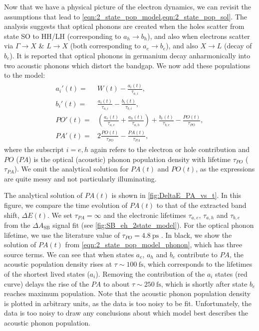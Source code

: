 Now that we have a physical picture of the electron dynamics, we can revisit the assumptions that lead to \cref{eqn:2_state_pop_model,eqn:2_state_pop_sol}. The analysis suggests that optical phonons are created when the holes scatter from state SO to HH/LH (corresponding to $a_h \rightarrow b_h$), and also when electrons scatter via $\Gamma \rightarrow X$ \& $L \rightarrow X$ (both corresponding to $a_e \rightarrow b_e$), and also $X \rightarrow L$ (decay of $b_e$). It is reported that optical phonons in germanium decay anharmonically into two acoustic phonons which distort the bandgap. We now add these populations to the model:
\begin{align}
\label{eqn:2_state_pop_model_phonon}
\begin{split}
a_{i}'(t) ={}& W(t) - \frac{a_{i}(t)}{\tau_{a,i}}, \\
b_{i}'(t) ={}& \frac{a_{i}(t)}{\tau_{a,i}} - \frac{b_{i}(t)}{\tau_{b,i}}, \\
PO'(t) ={}& \left( \frac{a_e(t)}{\tau_{a,e}} + \frac{a_h(t)}{\tau_{a,h}} \right) + \frac{b_e(t)}{\tau_{b,e}} - \frac{PO(t)}{\tau_{PO}}, \\
PA'(t) ={}& 2 \frac{PO(t)}{\tau_{PO}} - \frac{PA(t)}{\tau_{PA}},
\end{split}
\end{align}
where the subscript $i=e,h$ again refers to the electron or hole contribution and $PO$ ($PA$) is the optical (acoustic) phonon population density with lifetime $\tau_{PO}$ ($\tau_{PA}$). We omit the analytical solution for $PA(t)$ and $PO(t)$, as the expressions are quite messy and not particularly illuminating.

The analytical solution of $PA(t)$ is shown in \cref{fig:DeltaE_PA_vs_t}. In this figure, we compare the time evolution of $PA(t)$ to that of the extracted band shift, $\Delta E(t)$. We set $\tau_{PA} = \infty$ and the electronic lifetimes $\tau_{a,e}$, $\tau_{a,h}$ and $\tau_{b,e}$ from the $\Delta A_{\textrm{SB}}$ signal fit (see \cref{fig:SB_eh_2state_model}). For the optical phonon lifetime, we use the literature value of $\tau_{PO} = 4.8 \ \textrm{ps}$ \cite{kaplanFemtosecondTrackingCarrier2018}. In black, we show the solution of $PA(t)$ from \cref{eqn:2_state_pop_model_phonon}, which has three source terms. We can see that when states $a_e$, $a_h$ and $b_e$ contribute to $PA$, the acoustic population density rises at $\tau \sim 100 \ \textrm{fs}$, which corresponds to the lifetimes of the shortest lived states ($a_i$). Removing the contribution of the $a_i$ states (red curve) delays the rise of the $PA$ to about $\tau \sim 250 \ \textrm{fs}$, which is shortly after state $b_e$ reaches maximum population. Note that the acoustic phonon population density is plotted in arbitrary units, as the data is too noisy to be fit. Unfortunately, the data is too noisy to draw any conclusions about which model best describes the acoustic phonon population.


